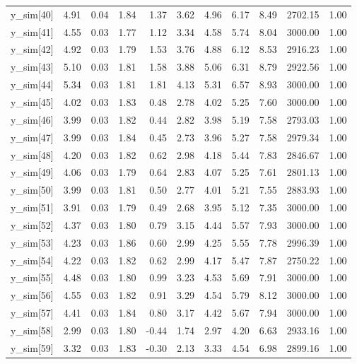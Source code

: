 \begin{table}[ht]
\begin{tabular}{rrrrrrrrrrr}
  y\_sim[40] & 4.91 & 0.04 & 1.84 & 1.37 & 3.62 & 4.96 & 6.17 & 8.49 & 2702.15 & 1.00 \\ 
  y\_sim[41] & 4.55 & 0.03 & 1.77 & 1.12 & 3.34 & 4.58 & 5.74 & 8.04 & 3000.00 & 1.00 \\ 
  y\_sim[42] & 4.92 & 0.03 & 1.79 & 1.53 & 3.76 & 4.88 & 6.12 & 8.53 & 2916.23 & 1.00 \\ 
  y\_sim[43] & 5.10 & 0.03 & 1.81 & 1.58 & 3.88 & 5.06 & 6.31 & 8.79 & 2922.56 & 1.00 \\ 
  y\_sim[44] & 5.34 & 0.03 & 1.81 & 1.81 & 4.13 & 5.31 & 6.57 & 8.93 & 3000.00 & 1.00 \\ 
  y\_sim[45] & 4.02 & 0.03 & 1.83 & 0.48 & 2.78 & 4.02 & 5.25 & 7.60 & 3000.00 & 1.00 \\ 
  y\_sim[46] & 3.99 & 0.03 & 1.82 & 0.44 & 2.82 & 3.98 & 5.19 & 7.58 & 2793.03 & 1.00 \\ 
  y\_sim[47] & 3.99 & 0.03 & 1.84 & 0.45 & 2.73 & 3.96 & 5.27 & 7.58 & 2979.34 & 1.00 \\ 
  y\_sim[48] & 4.20 & 0.03 & 1.82 & 0.62 & 2.98 & 4.18 & 5.44 & 7.83 & 2846.67 & 1.00 \\ 
  y\_sim[49] & 4.06 & 0.03 & 1.79 & 0.64 & 2.83 & 4.07 & 5.25 & 7.61 & 2801.13 & 1.00 \\ 
  y\_sim[50] & 3.99 & 0.03 & 1.81 & 0.50 & 2.77 & 4.01 & 5.21 & 7.55 & 2883.93 & 1.00 \\ 
  y\_sim[51] & 3.91 & 0.03 & 1.79 & 0.49 & 2.68 & 3.95 & 5.12 & 7.35 & 3000.00 & 1.00 \\ 
  y\_sim[52] & 4.37 & 0.03 & 1.80 & 0.79 & 3.15 & 4.44 & 5.57 & 7.93 & 3000.00 & 1.00 \\ 
  y\_sim[53] & 4.23 & 0.03 & 1.86 & 0.60 & 2.99 & 4.25 & 5.55 & 7.78 & 2996.39 & 1.00 \\ 
  y\_sim[54] & 4.22 & 0.03 & 1.82 & 0.62 & 2.99 & 4.17 & 5.47 & 7.87 & 2750.22 & 1.00 \\ 
  y\_sim[55] & 4.48 & 0.03 & 1.80 & 0.99 & 3.23 & 4.53 & 5.69 & 7.91 & 3000.00 & 1.00 \\ 
  y\_sim[56] & 4.55 & 0.03 & 1.82 & 0.91 & 3.29 & 4.54 & 5.79 & 8.12 & 3000.00 & 1.00 \\ 
  y\_sim[57] & 4.41 & 0.03 & 1.84 & 0.80 & 3.17 & 4.42 & 5.67 & 7.94 & 3000.00 & 1.00 \\ 
  y\_sim[58] & 2.99 & 0.03 & 1.80 & -0.44 & 1.74 & 2.97 & 4.20 & 6.63 & 2933.16 & 1.00 \\ 
  y\_sim[59] & 3.32 & 0.03 & 1.83 & -0.30 & 2.13 & 3.33 & 4.54 & 6.98 & 2899.16 & 1.00 \\ 

\end{tabular}
\end{table}
